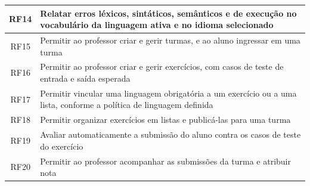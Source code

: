 \begin{table}[htbp]
\begin{tabular}{|c|>{\raggedright\arraybackslash}p{12.3cm}|}
        \hline
        RF14 & Relatar erros léxicos, sintáticos, semânticos e de execução no vocabulário da linguagem ativa e no idioma selecionado \\
        \hline
        RF15 & Permitir ao professor criar e gerir turmas, e ao aluno ingressar em uma turma \\
        \hline
        RF16 & Permitir ao professor criar e gerir exercícios, com casos de teste de entrada e saída esperada \\
        \hline
        RF17 & Permitir vincular uma linguagem obrigatória a um exercício ou a uma lista, conforme a política de linguagem definida \\
        \hline
        RF18 & Permitir organizar exercícios em listas e publicá-las para uma turma \\
        \hline
        RF19 & Avaliar automaticamente a submissão do aluno contra os casos de teste do exercício \\
        \hline
        RF20 & Permitir ao professor acompanhar as submissões da turma e atribuir nota \\
        \hline
    \end{tabular}
\end{table}


